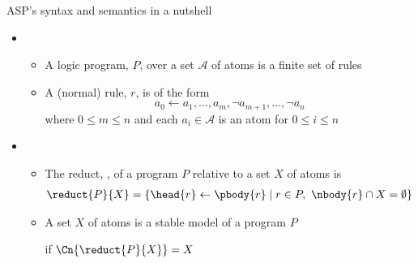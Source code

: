\begin{frame}{ASP's syntax and semantics in a nutshell}
  \medskip
  \begin{itemize}
  \item<1-> 
    \begin{itemize}
    \item
      A \alert{logic program}, $P$, over a set $\mathcal{A}$ of atoms is a finite \alert{set} of rules
      \smallskip
    \item
      A (normal) \alert{rule}, $r$, is of the form
      \[
        a_0 \leftarrow a_1,\dots,a_m, \neg a_{m+1}, \dots, \neg a_n
      \]
      where $0\leq m\leq n$ and each $a_i\in{\mathcal{A}}$ is an \alert{atom} for $0\leq i\leq n$
    \end{itemize}
    \medskip
  \item<1-> 
    \begin{itemize}
    \item The \alert{reduct}, , of a program $P$ relative to
      a set $X$ of atoms is
      \begin{align*}
        \reduct{P}{X} &= \{\head{r}\leftarrow\pbody{r} \mid r\in P,\ \nbody{r}\cap X=\emptyset\}
      \end{align*}
    \item A set $X$ of atoms is a \alert{stable model} of a program $P$

      if $\Cn{\reduct{P}{X}}=X$
    \end{itemize}
  \end{itemize}
\end{frame}
%
